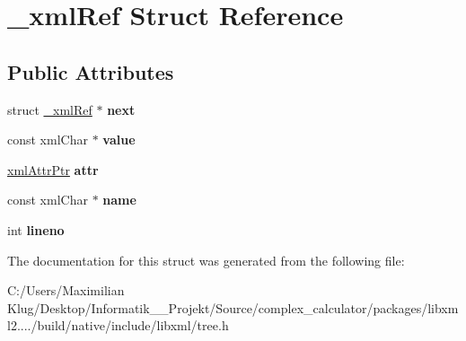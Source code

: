 \hypertarget{struct__xml_ref}{}\section{\+\_\+xml\+Ref Struct Reference}
\label{struct__xml_ref}
\subsection*{Public Attributes}
\begin{DoxyCompactItemize}
\item 
\mbox{\label{struct__xml_ref_a11ced87eb876462aefdaad07b6216e32}} 
struct \mbox{\hyperlink{struct__xml_ref}{\+\_\+xml\+Ref}} $\ast$ {\bfseries next}
\item 
\mbox{\label{struct__xml_ref_ac28785f779ebfd41e264c9e9e91e6660}} 
const xml\+Char $\ast$ {\bfseries value}
\item 
\mbox{\label{struct__xml_ref_a3ff97e4e127f1749ab2e59fdec0f8a8e}} 
\mbox{\hyperlink{struct__xml_attr}{xml\+Attr\+Ptr}} {\bfseries attr}
\item 
\mbox{\label{struct__xml_ref_a54973d491748936cc306713782f4f467}} 
const xml\+Char $\ast$ {\bfseries name}
\item 
\mbox{\label{struct__xml_ref_aa9d570e7f96cc7647c9b7fe96fc10eca}} 
int {\bfseries lineno}
\end{DoxyCompactItemize}


The documentation for this struct was generated from the following file\+:\begin{DoxyCompactItemize}
\item 
C\+:/\+Users/\+Maximilian Klug/\+Desktop/\+Informatik\+\_\+\_\+\+Projekt/\+Source/complex\+\_\+calculator/packages/libxml2..../build/native/include/libxml/tree.\+h\end{DoxyCompactItemize}
